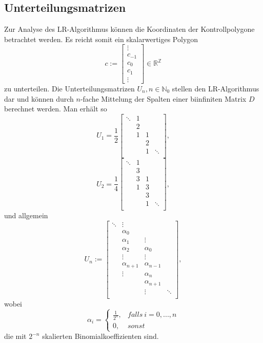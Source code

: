 \subsection{Unterteilungsmatrizen}
Zur Analyse des LR-Algorithmus können die Koordinaten der Kontrollpolygone betrachtet werden. Es reicht somit ein skalarwertiges Polygon
\[c := \begin{bmatrix} \vdots \\ c_{-1} \\ c_0 \\ c_1 \\ \vdots \end{bmatrix} \in \mathbb{R}^{\mathbb{Z}}\]
zu unterteilen.
Die Unterteilungsmatrizen \(U_n, n \in \mathbb{N}_0\) stellen den LR-Algorithmus dar und können durch \(n\)-fache Mittelung der Spalten einer biinfiniten Matrix \(D\) berechnet werden. Man erhält so
\[U_1 = \frac{1}{2}
\begin{bmatrix}
	\ddots 	& 1 			& 				& 			\\
			& 2 			& 				& 			\\
			& 1 			& 1 			& 			\\
			& 				& 2 			& 			\\
			& 				& 1 			& \ddots 	\\
\end{bmatrix},
\]
\[U_2 = \frac{1}{4}
\begin{bmatrix}
	\ddots 	& 1 			& 				&			\\
			& 3 			& 				&			\\
			& 3 			& 1 			&			\\
			& 1 			& 3 			&			\\
			& 				& 3 			&			\\
			& 				& 1 			& \ddots 	\\
\end{bmatrix},
\]
und allgemein
\[U_n :=
\begin{bmatrix}
	\ddots 	& \vdots 		&				&			\\
			& \alpha_0		&				&			\\
			& \alpha_1		& \vdots		&			\\
			& \alpha_2		& \alpha_0		&			\\
			& \vdots		& \vdots		&			\\
			& \alpha_{n+1}	& \alpha_{n-1} 	&			\\
			& \vdots		& \alpha_n		&			\\
			&				& \alpha_{n+1}	&			\\
			&				& \vdots		& \ddots 	\\
\end{bmatrix},
\]
wobei
\[\alpha_i = \begin{cases} \frac{1}{2^n}, & falls~i=0,...,n \\ 0, & sonst \end{cases}\]
die mit \(2^{-n}\) skalierten Binomialkoeffizienten sind.


